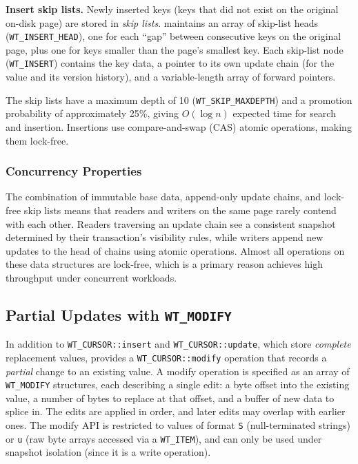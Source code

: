 \textbf{Insert skip lists.}  Newly inserted keys (keys that did not exist on the original on-disk page) are stored in \emph{skip lists}.
\wt{} maintains an array of skip-list heads (\texttt{WT\_INSERT\_HEAD}), one for each ``gap'' between consecutive keys on the original page, plus one for keys smaller than the page's smallest key.
Each skip-list node (\texttt{WT\_INSERT}) contains the key data, a pointer to its own update chain (for the value and its version history), and a variable-length array of forward pointers.

The skip lists have a maximum depth of 10 (\texttt{WT\_SKIP\_MAXDEPTH}) and a promotion probability of approximately 25\%, giving $O(\log n)$ expected time for search and insertion.
Insertions use compare-and-swap (CAS) atomic operations, making them lock-free.

\subsubsection{Concurrency Properties}

The combination of immutable base data, append-only update chains, and lock-free skip lists means that readers and writers on the same page rarely contend with each other.
Readers traversing an update chain see a consistent snapshot determined by their transaction's visibility rules, while writers append new updates to the head of chains using atomic operations.
Almost all operations on these data structures are lock-free, which is a primary reason \wt{} achieves high throughput under concurrent workloads.

\subsection{Partial Updates with \texttt{WT\_MODIFY}}
\label{sec:wt-modify}

In addition to \texttt{WT\_CURSOR::insert} and \texttt{WT\_CURSOR::update}, which store \emph{complete} replacement values, \wt{} provides a \texttt{WT\_CURSOR::modify} operation that records a \emph{partial} change to an existing value.
A modify operation is specified as an array of \texttt{WT\_MODIFY} structures, each describing a single edit: a byte offset into the existing value, a number of bytes to replace at that offset, and a buffer of new data to splice in.
The edits are applied in order, and later edits may overlap with earlier ones.  The modify API is restricted to values of format \texttt{S} (null-terminated strings) or \texttt{u} (raw byte arrays accessed via a \texttt{WT\_ITEM}), and can only be used under snapshot isolation (since it is a write operation).

